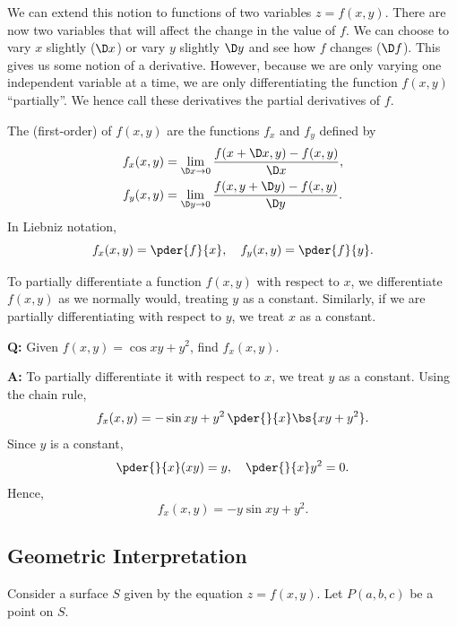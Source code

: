 We can extend this notion to functions of two variables $z = f(x, y)$. There are now two variables that will affect the change in the value of $f$. We can choose to vary $x$ slightly ($\D x$) or vary $y$ slightly $\D y$ and see how $f$ changes ($\D f$). This gives us some notion of a derivative. However, because we are only varying one independent variable at a time, we are only differentiating the function $f(x,y)$ ``partially''. We hence call these derivatives the partial derivatives of $f$.

\begin{definition}
    The (first-order)  of $f(x, y)$ are the functions $f_x$ and $f_y$ defined by
    \begin{align*}
        f_x(x, y) &= \lim_{\D x \to 0} \frac{f(x + \D x, y) - f(x, y)}{\D x},\\
        f_y(x, y) &= \lim_{\D y \to 0} \frac{f(x, y + \D y) - f(x, y)}{\D y}.
    \end{align*}
    In Liebniz notation, \[f_x(x, y) = \pder{f}{x}, \quad f_y(x, y) = \pder{f}{y}.\]
\end{definition}

\begin{recipe}
    To partially differentiate a function $f(x, y)$ with respect to $x$, we differentiate $f(x, y)$ as we normally would, treating $y$ as a constant. Similarly, if we are partially differentiating with respect to $y$, we treat $x$ as a constant.
\end{recipe}

\begin{example}
    \phantom{.}

    \textbf{Q:} Given $f(x, y) = \cos{xy + y^2}$, find $f_x(x, y)$.

    \textbf{A:} To partially differentiate it with respect to $x$, we treat $y$ as a constant. Using the chain rule, \[f_x (x, y) = -\sin{xy + y^2} \, \pder{}{x} \bs{xy + y^2}.\] Since $y$ is a constant, \[\pder{}{x} (xy) = y, \quad \pder{}{x} y^2 = 0.\] Hence, \[f_x (x, y) = -y\sin{xy + y^2}.\]
\end{example}

\subsection{Geometric Interpretation}\label{subsec:Partial-Derivative-Geometric}

Consider a surface $S$ given by the equation $z = f(x, y)$. Let $P(a, b, c)$ be a point on $S$.


